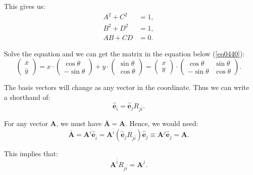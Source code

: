 \documentclass[10pt]{article}
\begin{document}
	This gives us:
	\begin{equation}
	  \begin{aligned}
	  A^{2} + C^{2} &= 1, \\
	  B^{2} + D^{2} &= 1, \\
	  AB + CD &= 0.
	  \end{aligned}
	\end{equation}

	Solve the equation and we can get the matrix in the equation below (\ref{eq0440}): 
	\begin{equation}\label{eq0440}
	  \begin{pmatrix} 
		  \bar{x} \\ \bar{y} 
	  \end{pmatrix} = x \cdot \begin{pmatrix} 
		  \cos \theta \\ - \sin \theta 
	  \end{pmatrix} + y \cdot  \begin{pmatrix} 
		  \sin \theta \\ \cos \theta 
	  \end{pmatrix} = \begin{pmatrix} 
		  x \\ y 
	  \end{pmatrix} \cdot \begin{pmatrix} 
		  \cos \theta & \sin \theta \\ -\sin \theta & \cos \theta 
	  \end{pmatrix}.
	\end{equation}

	The basis vectors will change as any vector in the coordinate. Thus we can write a shorthand of:
	\begin{equation}
	  \hat{\mathbf{e}}_{\bar{i}} = \hat{\mathbf{e}}_{j} R_{j\bar{i}}.
	\end{equation}

	For any vector $\mathbf{A}$, we must have $\bar{\mathbf{A}} = \mathbf{A}$. Hence, we would need:
	\begin{equation}
	  \bar{\mathbf{A}} = \mathbf{A}^{\bar{i}} \hat{\mathbf{e}}_{\bar{i}} = \mathbf{A}^{\bar{i}}(\hat{\mathbf{e}}_{j}R_{j \bar{i}})\hat{\mathbf{e}}_{j} \equiv \mathbf{A}^{j}\hat{\mathbf{e}}_{j} = \mathbf{A}.
	\end{equation}

	This implies that:
	\begin{equation}
	  \mathbf{A}^{\bar{i}} R_{j \bar{i}} = \mathbf{A}^{j}.
	\end{equation}
\end{document}
